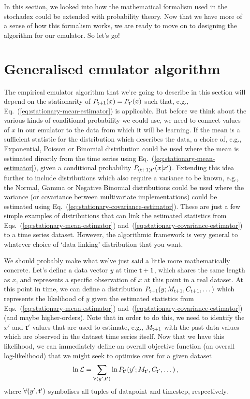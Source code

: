 In this section, we looked into how the mathematical formalism used in the stochadex could be extended with probability theory. Now that we have more of a sense of how this formalism works, we are ready to move on to designing the algorithm for our emulator. So let's go!

\section{\sffamily Generalised emulator algorithm}

The empirical emulator algorithm that we're going to describe in this section will depend on the stationarity of $P_{{\sf t}+1}(x)=P_{{\sf t}'}(x)$ such that, e.g., Eq.~(\ref{eq:stationary-mean-estimator}) is applicable. But before we think about the various kinds of conditional probability we could use, we need to connect values of $x$ in our emulator to the data from which it will be learning. If the mean is a sufficient statistic for the distribution which describes the data, a choice of, e.g., Exponential, Poisson or Binomial distribution could be used where the mean is estimated directly from the time series using Eq.~(\ref{eq:stationary-mean-estimator}), given a conditional probability $P_{({\sf t}+1){\sf t}'}(x\vert x')$. Extending this idea further to include distributions which also require a variance to be known, e.g., the Normal, Gamma or Negative Binomial distributions could be used where the variance (or covariance between multivariate implementations) could be estimated using Eq.~(\ref{eq:stationary-covariance-estimator}). These are just a few simple examples of distributions that can link the estimated statistics from Eqs.~(\ref{eq:stationary-mean-estimator}) and~(\ref{eq:stationary-covariance-estimator}) to a time series dataset. However, the algorithmic framework is very general to whatever choice of `data linking' distribution that you want.

We should probably make what we've just said a little more mathematically concrete. Let's define a data vector $y$ at time ${\sf t}+1$, which shares the same length as $x$, and represents a specific observation of $x$ at this point in a real dataset. At this point in time, we can define a distribution $P_{{\sf t}+1}(y;M_{{\sf t}+1},C_{{\sf t}+1},\dots )$ which represents the likelihood of $y$ given the estimated statistics from Eqs.~(\ref{eq:stationary-mean-estimator}) and~(\ref{eq:stationary-covariance-estimator}) (and maybe higher-orders). Note that in order to do this, we need to identify the $x'$ and ${\sf t}'$ values that are used to estimate, e.g., $M_{{\sf t}+1}$ with the past data values which are observed in the dataset time series itself. Now that we have this likelihood, we can immediately define an overall objective function (an overall log-likelihood) that we might seek to optimise over for a given dataset 
\begin{align}
\ln {\cal L} = \sum_{\forall (y',{\sf t}')} \ln P_{{\sf t}'}(y';M_{{\sf t}'},C_{{\sf t}'},\dots ) \,, \label{eq:log-likelihood-emulator}
\end{align}
where $\forall (y',{\sf t}')$ symbolises all tuples of datapoint and timestep, respectively. 

